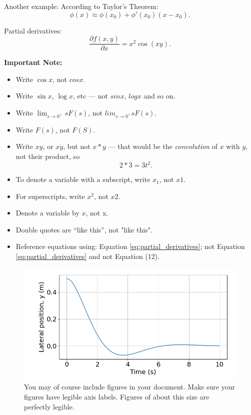 \documentclass[a4paper,11pt,reqno]{amsart}
\begin{document}
        Another example: According to Taylor's Theorem:
        \begin{equation}
            \phi(x) \approx \phi(x_0) + \phi'(x_0)(x-x_0).
        \end{equation}
        
        Partial derivatives:
        \begin{equation}
            \label{eq:partial_derivatives}
            \frac{\partial f(x, y)}{\partial x} = x^2\cos(xy).
        \end{equation}
        
        \begin{tcolorbox}[title={Common typesetting mistakes}]
            \textbf{Important Note:} 
            \begin{itemize}
                \item Write $\cos x$, not $cos x$.
                \item Write $\sin x$, $\log x$, etc --- not $sin x$, $log x$ and so on.
                \item Write $\lim_{s\to 0^+} sF(s)$, not $lim_{s\to 0^+} sF(s)$.
                \item Write $F(s)$, not $F(S)$. 
                \item Write $xy$, or $x\dot y$, but not $x*y$ --- that would be the \textit{convolution} of     $x$ with $y$, not their product, so
                    \begin{equation}
                        2 * 3 = 3t^2.
                    \end{equation}
                \item To denote a variable with a subscript, write $x_1$, not $x1$.
                \item For superscripts, write $x^2$, not $x2$.
                \item Denote a variable by $x$, not x. 
                \item Double quotes are ``like this'', not "like this".
                \item Reference equations using: Equation \eqref{eq:partial_derivatives}; not Equation \ref{eq:partial_derivatives} and not Equation (12).
            \end{itemize}
        \end{tcolorbox}
        
        
        
        \begin{figure}
            \centering
            \includegraphics[width=0.65\linewidth]{figures/lateral_position}
            \caption{You may of course include figures in your document. Make sure your figures have legible axis labels. Figures of about this size are perfectly legible.}
        \end{figure}
\end{document}
